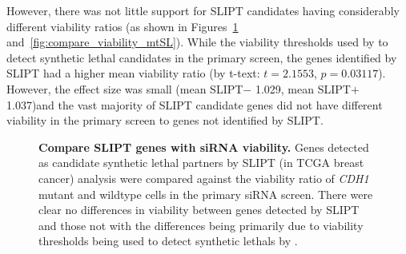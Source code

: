 However, there was not little support for \gls{SLIPT} candidates having considerably different viability ratios (as shown in Figures~\ref{fig:compare_viability_SL} and~\ref{fig:compare_viability_mtSL}). While the viability thresholds used by \citet{Telford2015} to detect \gls{synthetic lethal} candidates in the primary screen, the genes identified by \gls{SLIPT} had a higher mean viability ratio (by t-text: $t=2.1553$, $p=0.03117$). However, the effect size was small (mean SLIPT$-$ 1.029, mean SLIPT$+$ 1.037)and the vast majority of \gls{SLIPT} candidate genes did not have different viability in the primary screen to genes not identified by \gls{SLIPT}.

\begin{figure}[!htp]
\begin{center}
   \end{center}
   \caption[Compare \gls{SLIPT} genes with \gls{siRNA} viability]{\small \textbf{Compare \gls{SLIPT} genes with \gls{siRNA} viability.} Genes detected as candidate \gls{synthetic lethal} partners by \gls{SLIPT} (in \gls{TCGA} breast cancer)  analysis were compared against the viability ratio of \textit{CDH1} \gls{mutant} and wildtype cells in the primary \gls{siRNA} screen. There were clear no differences in viability between genes detected by \gls{SLIPT} and those not with the differences being primarily due to viability thresholds being used to detect \glspl{synthetic lethal} by \citet{Telford2015}. 
}
\label{fig:compare_viability_SL}
\end{figure}

